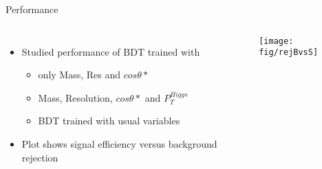 \documentclass[t]{beamer}
\begin{document}
\begin{frame}{Performance}
  \begin{columns}[c]
  \begin{itemize}
    \item Studied performance of BDT trained with 
    \begin{itemize}
      \item only Mass, Res and $cos\theta*$ 
      \item Mass, Resolution, $cos\theta*$ and $P_T^{Higgs}$
      \item BDT trained with usual variables
    \end{itemize}
    \item Plot shows signal efficiency versus background rejection
  \end{itemize}
    \texttt{[image: fig/rejBvsS]}
  \end{columns}
\end{frame}
\end{document}
